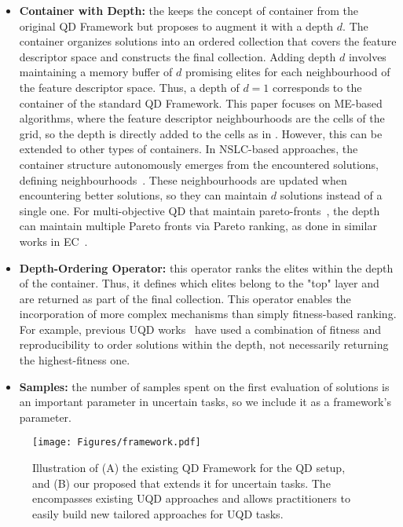 \begin{itemize}
    \item \textbf{Container with Depth:} the \framework{} keeps the concept of container from the original QD Framework but proposes to augment it with a depth $d$. The container organizes solutions into an ordered collection that covers the feature descriptor space and constructs the final collection. Adding depth $d$ involves maintaining a memory buffer of $d$ promising elites for each neighbourhood of the feature descriptor space. Thus, a depth of $d=1$ corresponds to the container of the standard QD Framework. 
    This paper focuses on ME-based algorithms, where the feature descriptor neighbourhoods are the cells of the grid, so the depth is directly added to the cells as in \name{}. 
    However, this can be extended to other types of containers. 
    In NSLC-based approaches, the container structure autonomously emerges from the encountered solutions, defining neighbourhoods~\cite{lehman2011evolving}. These neighbourhoods are updated when encountering better solutions, so they can maintain $d$ solutions instead of a single one. 
    For multi-objective QD that maintain pareto-fronts~\cite{pierrot2022multi, janmohamed2023improving}, the depth can maintain multiple Pareto fronts via Pareto ranking, as done in similar works in EC~\cite{siegmund2013comparative, siegmund2015hybrid}. 
    
    \item \textbf{Depth-Ordering Operator:} this operator ranks the elites within the depth of the container. Thus, it defines which elites belong to the "top" layer and are returned as part of the final collection. 
    This operator enables the incorporation of more complex mechanisms than simply fitness-based ranking. For example, previous UQD works~\cite{flageat2024exploring} have used a combination of fitness and reproducibility to order solutions within the depth, not necessarily returning the highest-fitness one.

    \item \textbf{Samples:} the number of samples spent on the first evaluation of solutions is an important parameter in uncertain tasks, so we include it as a framework's parameter. 

\end{itemize}

\begin{figure}[t!]
  \centering
  \texttt{[image: Figures/framework.pdf]}
  \caption{
    Illustration of (A) the existing QD Framework for the QD setup, and (B) our proposed \framework{} that extends it for uncertain tasks. The \framework{} encompasses existing UQD approaches and allows practitioners to easily build new tailored approaches for UQD tasks.
  }
  \label{fig:framework}
\end{figure}


